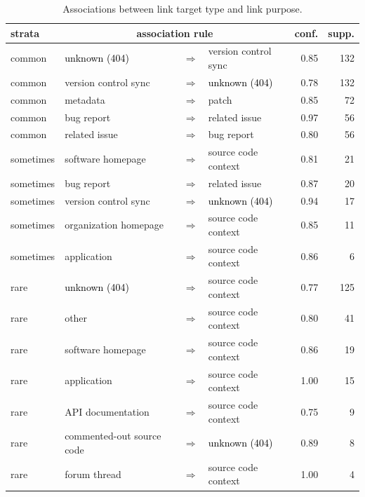 \documentclass[smallextended]{svjour3}       %
\newcommand{\minor}[1]{\textcolor{black}{#1}}
\begin{document}
\begin{table}[t]
\centering
\caption{Associations between link target type and link purpose.}
\label{tab:rule}      
\begin{tabular}{llclrr}
\toprule
\textbf{strata}&  \multicolumn{3}{c}{\textbf{ association rule}} &  \textbf{conf.} &  \textbf{supp.} \\
\midrule
common & \minor{unknown (404)}  & $\Rightarrow$ & version control sync  & 0.85 & 132 \\
common & version control sync & $\Rightarrow$ & \minor{unknown (404)} & 0.78 & 132 \\ 
common & metadata & $\Rightarrow$ & patch & 0.85 & 72 \\ 
common & bug report & $\Rightarrow$ & related issue & 0.97 & 56 \\ 
common & related issue & $\Rightarrow$ & bug report & 0.80 & 56 \\ 
\midrule
sometimes & software homepage & $\Rightarrow$ & source code context & 0.81 & 21 \\ 
sometimes & bug report & $\Rightarrow$ & related issue & 0.87 & 20 \\ 
sometimes & version control sync & $\Rightarrow$ & \minor{unknown (404)} & 0.94 & 17 \\ 
sometimes & organization homepage & $\Rightarrow$ & source code context & 0.85 & 11 \\ 
sometimes & application & $\Rightarrow$ & source code context & 0.86 & 6 \\ 
\midrule
rare & \minor{unknown (404)} & $\Rightarrow$ & source code context & 0.77 & 125 \\ 
rare & other & $\Rightarrow$ & source code context & 0.80 & 41 \\ 
rare & software homepage & $\Rightarrow$ & source code context & 0.86 & 19 \\ 
rare & application & $\Rightarrow$ & source code context & 1.00 & 15 \\ 
rare & API documentation & $\Rightarrow$ & source code context & 0.75 & 9 \\ 
rare & commented-out source code & $\Rightarrow$ & \minor{unknown (404)} & 0.89 & 8 \\ 
rare & forum thread & $\Rightarrow$ & source code context & 1.00 & 4 \\ 
\bottomrule
\end{tabular}
\end{table}
\end{document}
